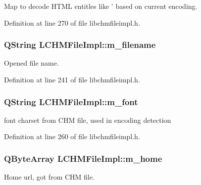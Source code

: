 Map to decode H\+T\+M\+L entitles like \'{} based on current encoding. 



Definition at line 270 of file libchmfileimpl.\+h.

\hypertarget{classLCHMFileImpl_a7e8bf327eeb1f4a3ccebb46ae6bd1bfa}{
\subsubsection[{m\+\_\+filename}]{\setlength{\rightskip}{0pt plus 5cm}Q\+String L\+C\+H\+M\+File\+Impl\+::m\+\_\+filename}}\label{classLCHMFileImpl_a7e8bf327eeb1f4a3ccebb46ae6bd1bfa}


Opened file name. 



Definition at line 241 of file libchmfileimpl.\+h.

\hypertarget{classLCHMFileImpl_a2b0d1d5b99fef328aa6a8f2c7ba7a495}{
\subsubsection[{m\+\_\+font}]{\setlength{\rightskip}{0pt plus 5cm}Q\+String L\+C\+H\+M\+File\+Impl\+::m\+\_\+font}}\label{classLCHMFileImpl_a2b0d1d5b99fef328aa6a8f2c7ba7a495}


font charset from C\+H\+M file, used in encoding detection 



Definition at line 260 of file libchmfileimpl.\+h.

\hypertarget{classLCHMFileImpl_a5bf6157ef7d4bc446c389eea871c09a0}{
\subsubsection[{m\+\_\+home}]{\setlength{\rightskip}{0pt plus 5cm}Q\+Byte\+Array L\+C\+H\+M\+File\+Impl\+::m\+\_\+home}}\label{classLCHMFileImpl_a5bf6157ef7d4bc446c389eea871c09a0}


Home url, got from C\+H\+M file. 



